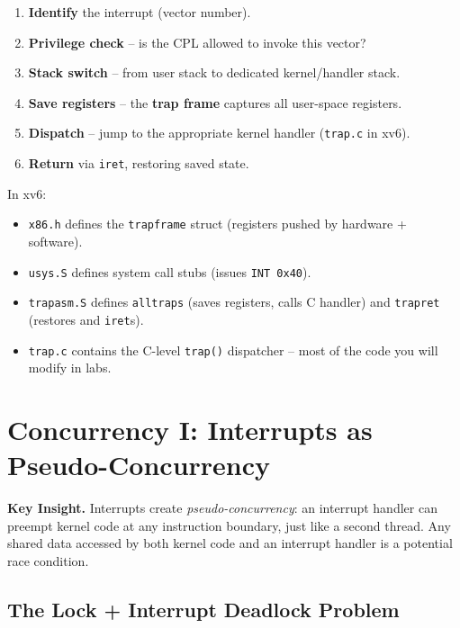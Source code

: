 \documentclass[11pt,a4paper]{article}
\newcommand{\term}[1]{\textbf{#1}}
\newcommand{\code}[1]{\texttt{#1}}
\newcommand{\xv}{xv6}
\begin{document}
\begin{enumerate}
  \item \textbf{Identify} the interrupt (vector number).
  \item \textbf{Privilege check} -- is the CPL allowed to invoke this vector?
  \item \textbf{Stack switch} -- from user stack to dedicated kernel/handler
        stack.
  \item \textbf{Save registers} -- the \term{trap frame} captures all
        user-space registers.
  \item \textbf{Dispatch} -- jump to the appropriate kernel handler
        (\code{trap.c} in \xv).
  \item \textbf{Return} via \code{iret}, restoring saved state.
\end{enumerate}

In \xv:
\begin{itemize}
  \item \code{x86.h} defines the \code{trapframe} struct (registers pushed by
    hardware + software).
  \item \code{usys.S} defines system call stubs (issues \code{INT 0x40}).
  \item \code{trapasm.S} defines \code{alltraps} (saves registers, calls C
    handler) and \code{trapret} (restores and \code{iret}s).
  \item \code{trap.c} contains the C-level \code{trap()} dispatcher -- most
    of the code you will modify in labs.
\end{itemize}

\section{Concurrency I: Interrupts as Pseudo-Concurrency}

\begin{warnbox}
\textbf{Key Insight.} Interrupts create \emph{pseudo-concurrency}: an
interrupt handler can preempt kernel code at any instruction boundary, just
like a second thread.  Any shared data accessed by both kernel code and an
interrupt handler is a potential race condition.
\end{warnbox}

\subsection{The Lock + Interrupt Deadlock Problem}
\end{document}
